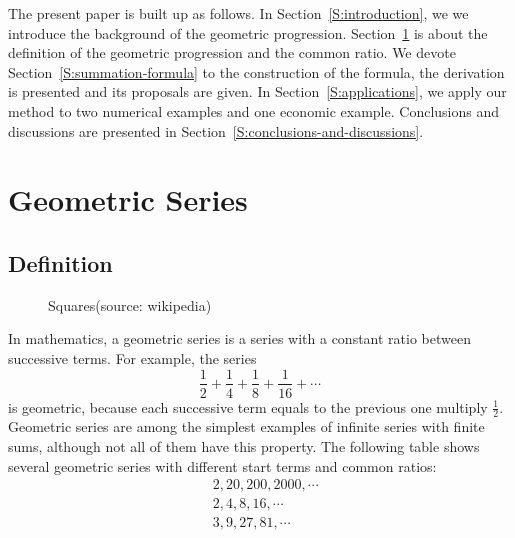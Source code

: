The present paper is built up as follows. In Section~\ref{S:introduction}, we  we introduce the background of the geometric progression. Section~\ref{S:geometric-series} is about the definition of the geometric progression and the common ratio. We devote Section~\ref{S:summation-formula} to the construction of the formula, the derivation is presented and its proposals are given. In Section~\ref{S:applications}, we apply our method to two numerical examples and one economic example. Conclusions and discussions are presented in Section~\ref{S:conclusions-and-discussions}.



\section{Geometric Series}\label{S:geometric-series}
\subsection{Definition}
\begin{figure}[h]
    \caption{Squares(source: wikipedia)}\label{F:geometric-progression}
\end{figure}

In mathematics, a geometric series is a series with a constant ratio between successive terms. For example, the series 
\begin{equation*}
    \frac{1}{2}+\frac{1}{4}+\frac{1}{8}+\frac{1}{16}+\cdots
\end{equation*}
is geometric, because each successive term equals to the previous one multiply $\frac{{1}}{{2}}$. Geometric series are among the simplest examples of infinite series with finite sums, although not all of them have this property. 
The following table shows several geometric series with different start terms and common ratios:
\begin{equation*}
    \begin{aligned}
        & 2, 20, 200, 2000, \cdots \\
        & 2, 4, 8, 16, \cdots \\
        & 3, 9, 27, 81, \cdots 
    \end{aligned}
\end{equation*}



